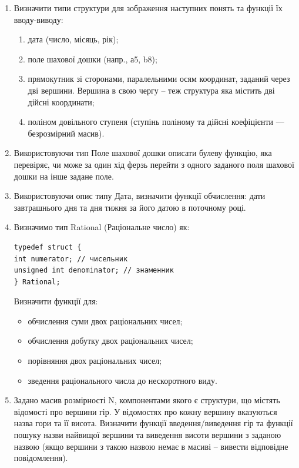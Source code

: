 \documentclass[a5paper,titlepage,openany,twoside,
]
{book_unv}%
\makeatletter
\newcommand{\xslalph}[1]{\expandafter\@xslalph\csname c@#1\endcsname}
\newcommand{\@xslalph}[1]{%
    \ifcase#1\or а\or б\or в\or г\or д\or e\or є\or ж\or з\or i%
    \or й\or к\or л\or м\or н\or о\or п\or р\or с\or т%
    \or у\or ф\or х\or ц\or ч\or ш\or ю\or я\or аа\or бб\or вв%
    \else\@ctrerr\fi%
}
\makeatother
\begin{document}
\begin{enumerate}
\def\labelenumi{\arabic{enumi})}
\item
  Визначити типи структури для зображення наступних понять та функції їх вводу-виводу:
 \begin{enumerate}[label=\xslalph*)]
 \item дата (число, місяць, рік);
 \item поле шахової дошки (напр., а5, b8);
 \item прямокутник зі сторонами, паралельними осям координат, заданий через дві вершини.
Вершина в свою чергу -- теж структура яка містить дві дійсні координати;
 \item поліном довільного ступеня (ступінь поліному та дійсні коефіцієнти --- безрозмірний
масив).
 \end{enumerate}

\item
 Використовуючи тип Поле шахової дошки описати булеву функцію, яка
перевіряє, чи може за один хід ферзь перейти з одного заданого поля
шахової дошки на інше задане поле.

\item
 Використовуючи опис типу Дата, визначити функції обчислення:
дати завтрашнього дня та дня тижня за його датою в поточному році.

\item
 Визначимо тип Rational (Раціональне число) як:
\begin{verbatim}
typedef struct {
int numerator; // чисельник
unsigned int denominator; // знаменник
} Rational;
\end{verbatim}

Визначити функції для:
\begin{itemize}
\item обчислення суми двох раціональних чисел;
\item обчислення добутку двох раціональних чисел;
\item порівняння двох раціональних чисел;
\item зведення раціонального числа до нескоротного виду.
\end{itemize}


\item
 Задано масив розмірності N, компонентами якого є структури, 
що містять відомості про вершини гір. У відомостях про 
кожну вершину вказуються назва гори та її висота.
Визначити функції введення/виведення гір та функції пошуку назви
найвищої вершини та виведення висоти вершини з заданою назвою (якщо
вершини з такою назвою немає в масиві -- вивести відповідне
повідомлення).
\end{enumerate}
\end{document}
